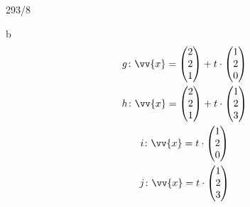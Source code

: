 \begin{exercise}{293/8}
  \item [b]
  \begin{gather*}
    g \colon \vv{x} = \begin{pmatrix}2 \\ 2 \\ 1\end{pmatrix} + t \cdot \begin{pmatrix}1 \\ 2 \\ 0\end{pmatrix} \\
    h \colon \vv{x} = \begin{pmatrix}2 \\ 2 \\ 1\end{pmatrix} + t \cdot \begin{pmatrix}1 \\ 2 \\ 3\end{pmatrix} \\
    i \colon \vv{x} = t \cdot \begin{pmatrix}1 \\ 2 \\ 0\end{pmatrix} \\
    j \colon \vv{x} = t \cdot \begin{pmatrix}1 \\ 2 \\ 3\end{pmatrix}
  \end{gather*}
\end{exercise}
